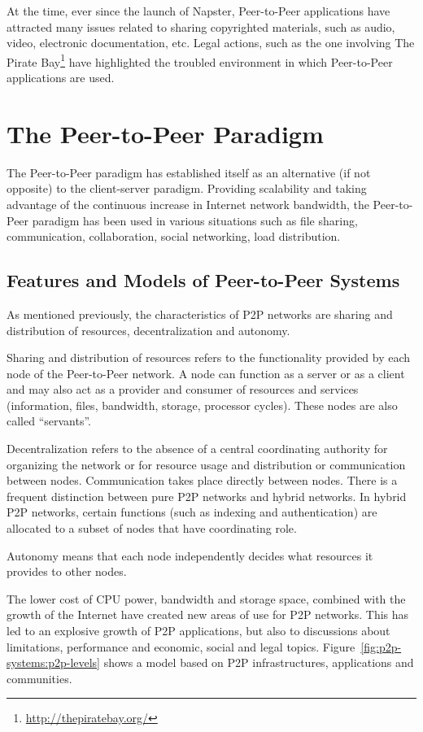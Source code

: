 At the time, ever since the launch of Napster, Peer-to-Peer applications have
attracted many issues related to sharing copyrighted materials, such as audio,
video, electronic documentation, etc. Legal actions, such as the one involving
The Pirate Bay\footnote{\url{http://thepiratebay.org/}} have highlighted the troubled environment in
which Peer-to-Peer applications are used.

\section{The Peer-to-Peer Paradigm}
\label{sec:p2p-systems:paragigm}

The Peer-to-Peer paradigm has established itself as an alternative (if not
opposite) to the client-server paradigm. Providing scalability and taking
advantage of the continuous increase in Internet network bandwidth, the
Peer-to-Peer paradigm has been used in various situations such as file
sharing, communication, collaboration, social networking, load distribution.

\subsection{Features and Models of Peer-to-Peer Systems}

As mentioned previously, the characteristics of P2P networks are sharing and
distribution of resources, decentralization and autonomy.

Sharing and distribution of resources refers to the functionality provided by
each node of the Peer-to-Peer network. A node can function as a server or as a
client and may also act as a provider and consumer of resources and
services (information, files, bandwidth, storage, processor cycles). These
nodes are also called ``servants''.

Decentralization refers to the absence of a central coordinating authority for
organizing the network or for resource usage and distribution or communication
between nodes. Communication takes place directly between nodes. There is a
frequent distinction between pure P2P networks and hybrid networks. In
hybrid P2P networks, certain functions (such as indexing and authentication)
are allocated to a subset of nodes that have coordinating role.

Autonomy means that each node independently decides what resources it provides
to other nodes.

The lower cost of CPU power, bandwidth and storage space, combined with
the growth of the Internet have created new areas of use for P2P networks.
This has led to an explosive growth of P2P applications, but also to
discussions about limitations, performance and economic, social and legal
topics.  Figure~\ref{fig:p2p-systems:p2p-levels} shows a model based on P2P
infrastructures, applications and communities.

